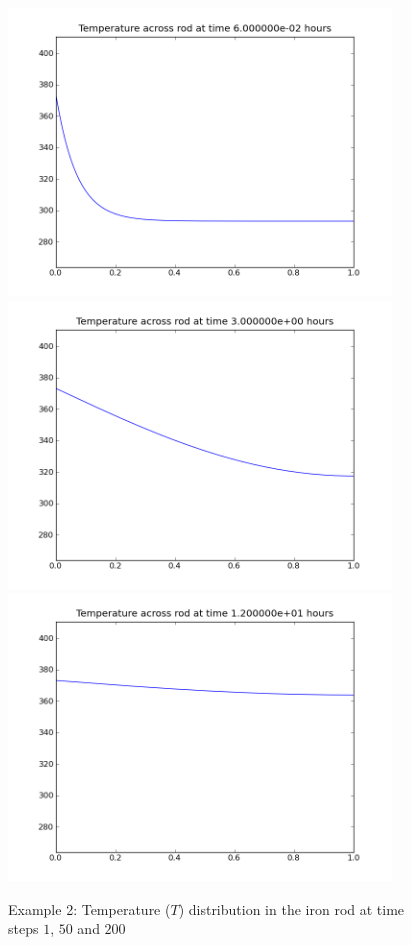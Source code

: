 \begin{figure}[ht]
\begin{center}
\includegraphics[width=4in]{figures/rodpyplot001}
\includegraphics[width=4in]{figures/rodpyplot050}
\includegraphics[width=4in]{figures/rodpyplot200}
\caption{Example 2: Temperature ($T$) distribution in the iron rod at time steps
$1$, $50$ and $200$}
\label{fig:onedheatout 002} 
\end{center}
\end{figure}

